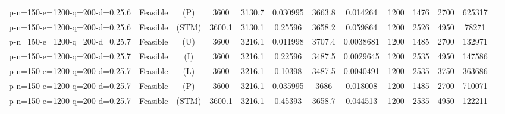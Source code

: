 \documentclass[landscape, a4paper]{article}
\newcommand{\STM}{\ensuremath{\mathrm{STM}}}
\newcommand{\Improved}{\ensuremath{\mathrm{I}}}
\newcommand{\Loose}{\ensuremath{\mathrm{L}}}
\newcommand{\Profit}{\ensuremath{\mathrm{P}}}
\newcommand{\Utility}{\ensuremath{\mathrm{U}}}
\begin{document}
\begin{center}
\begin{tabular}{lcccccccccccc}
p-n=150-e=1200-q=200-d=0.25.6 & Feasible & (\Profit) & 3600 & 3130.7 & 0.030995 & 3663.8 & 0.014264 & 1200 & 1476 & 2700 & 625317 & \\
p-n=150-e=1200-q=200-d=0.25.6 & Feasible & (\STM) & 3600.1 & 3130.1 & 0.25596 & 3658.2 & 0.059864 & 1200 & 2526 & 4950 & 78271 & \\
p-n=150-e=1200-q=200-d=0.25.7 & Feasible & (\Utility) & 3600 & 3216.1 & 0.011998 & 3707.4 & 0.0038681 & 1200 & 1485 & 2700 & 132971 & \\
p-n=150-e=1200-q=200-d=0.25.7 & Feasible & (\Improved) & 3600 & 3216.1 & 0.22596 & 3487.5 & 0.0029645 & 1200 & 2535 & 4950 & 147586 & \\
p-n=150-e=1200-q=200-d=0.25.7 & Feasible & (\Loose) & 3600 & 3216.1 & 0.10398 & 3487.5 & 0.0040491 & 1200 & 2535 & 3750 & 363686 & \\
p-n=150-e=1200-q=200-d=0.25.7 & Feasible & (\Profit) & 3600 & 3216.1 & 0.035995 & 3686 & 0.018008 & 1200 & 1485 & 2700 & 710071 & \\
p-n=150-e=1200-q=200-d=0.25.7 & Feasible & (\STM) & 3600.1 & 3216.1 & 0.45393 & 3658.7 & 0.044513 & 1200 & 2535 & 4950 & 122211 & \\
\end{tabular}
\end{center}
\end{document}
